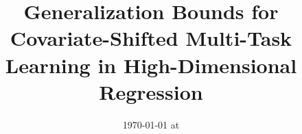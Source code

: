 \documentclass{article}
\begin{document}
\title{Generalization Bounds for Covariate-Shifted Multi-Task Learning in High-Dimensional Regression}
\date{}
\maketitle
\date{{\ddmmyyyydate\today} at \currenttime}






	
	
\end{document}
